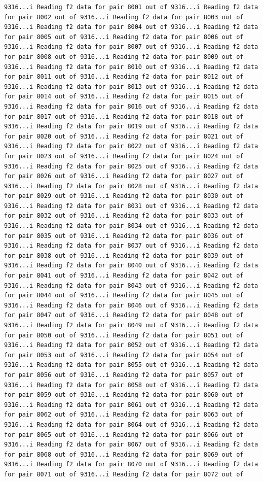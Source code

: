 \documentclass[
]{article}
\begin{document}
\begin{verbatim}
9316...i Reading f2 data for pair 8001 out of 9316...i Reading f2 data for pair 8002 out of 9316...i Reading f2 data for pair 8003 out of 9316...i Reading f2 data for pair 8004 out of 9316...i Reading f2 data for pair 8005 out of 9316...i Reading f2 data for pair 8006 out of 9316...i Reading f2 data for pair 8007 out of 9316...i Reading f2 data for pair 8008 out of 9316...i Reading f2 data for pair 8009 out of 9316...i Reading f2 data for pair 8010 out of 9316...i Reading f2 data for pair 8011 out of 9316...i Reading f2 data for pair 8012 out of 9316...i Reading f2 data for pair 8013 out of 9316...i Reading f2 data for pair 8014 out of 9316...i Reading f2 data for pair 8015 out of 9316...i Reading f2 data for pair 8016 out of 9316...i Reading f2 data for pair 8017 out of 9316...i Reading f2 data for pair 8018 out of 9316...i Reading f2 data for pair 8019 out of 9316...i Reading f2 data for pair 8020 out of 9316...i Reading f2 data for pair 8021 out of 9316...i Reading f2 data for pair 8022 out of 9316...i Reading f2 data for pair 8023 out of 9316...i Reading f2 data for pair 8024 out of 9316...i Reading f2 data for pair 8025 out of 9316...i Reading f2 data for pair 8026 out of 9316...i Reading f2 data for pair 8027 out of 9316...i Reading f2 data for pair 8028 out of 9316...i Reading f2 data for pair 8029 out of 9316...i Reading f2 data for pair 8030 out of 9316...i Reading f2 data for pair 8031 out of 9316...i Reading f2 data for pair 8032 out of 9316...i Reading f2 data for pair 8033 out of 9316...i Reading f2 data for pair 8034 out of 9316...i Reading f2 data for pair 8035 out of 9316...i Reading f2 data for pair 8036 out of 9316...i Reading f2 data for pair 8037 out of 9316...i Reading f2 data for pair 8038 out of 9316...i Reading f2 data for pair 8039 out of 9316...i Reading f2 data for pair 8040 out of 9316...i Reading f2 data for pair 8041 out of 9316...i Reading f2 data for pair 8042 out of 9316...i Reading f2 data for pair 8043 out of 9316...i Reading f2 data for pair 8044 out of 9316...i Reading f2 data for pair 8045 out of 9316...i Reading f2 data for pair 8046 out of 9316...i Reading f2 data for pair 8047 out of 9316...i Reading f2 data for pair 8048 out of 9316...i Reading f2 data for pair 8049 out of 9316...i Reading f2 data for pair 8050 out of 9316...i Reading f2 data for pair 8051 out of 9316...i Reading f2 data for pair 8052 out of 9316...i Reading f2 data for pair 8053 out of 9316...i Reading f2 data for pair 8054 out of 9316...i Reading f2 data for pair 8055 out of 9316...i Reading f2 data for pair 8056 out of 9316...i Reading f2 data for pair 8057 out of 9316...i Reading f2 data for pair 8058 out of 9316...i Reading f2 data for pair 8059 out of 9316...i Reading f2 data for pair 8060 out of 9316...i Reading f2 data for pair 8061 out of 9316...i Reading f2 data for pair 8062 out of 9316...i Reading f2 data for pair 8063 out of 9316...i Reading f2 data for pair 8064 out of 9316...i Reading f2 data for pair 8065 out of 9316...i Reading f2 data for pair 8066 out of 9316...i Reading f2 data for pair 8067 out of 9316...i Reading f2 data for pair 8068 out of 9316...i Reading f2 data for pair 8069 out of 9316...i Reading f2 data for pair 8070 out of 9316...i Reading f2 data for pair 8071 out of 9316...i Reading f2 data for pair 8072 out of 
\end{verbatim}
\end{document}
